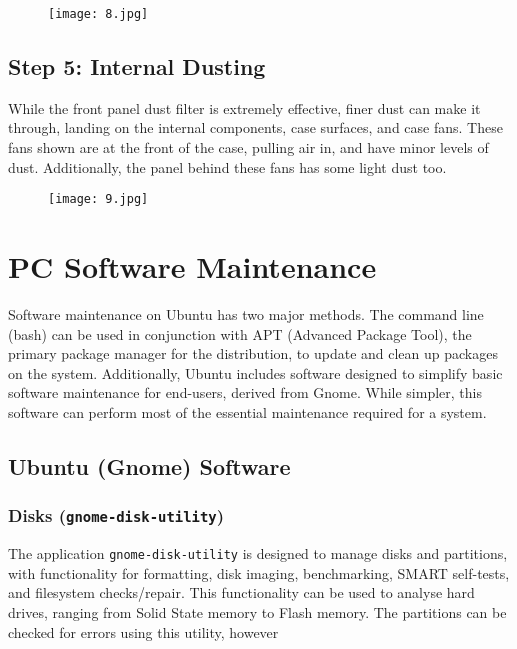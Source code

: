 \documentclass[11pt]{amsart}
\begin{document}
\begin{figure}[h]{}
\centering\texttt{[image: 8.jpg]}
\caption{}

\end{figure}

\hypertarget{x-step-5:-internal-dusting}{\subsection*{Step 5: Internal Dusting}}
While the front panel dust filter is extremely effective, finer dust can make it through, landing on the internal components, case surfaces, and case fans. These fans shown are at the front of the case, pulling air in, and have minor levels of dust. Additionally, the panel behind these fans has some light dust too.


\begin{figure}[h]{}
\centering\texttt{[image: 9.jpg]}
\caption{}

\end{figure}

\hypertarget{x-pc-software-maintenance}{\section*{PC Software Maintenance}}
Software maintenance on Ubuntu has two major methods. The command line (bash) can be used in conjunction with APT (Advanced Package Tool), the primary package manager for the distribution, to update and clean up packages on the system. Additionally, Ubuntu includes software designed to simplify basic software maintenance for end-users, derived from Gnome. While simpler, this software can perform most of the essential maintenance required for a system.


\hypertarget{x-ubuntu-(gnome)-software}{\subsection*{Ubuntu (Gnome) Software}}
\hypertarget{x-disks-(\texttt{gnome-disk-utility})}{\subsubsection*{Disks (\texttt{gnome-disk-utility})}}
The application \texttt{gnome-disk-utility} is designed to manage disks and partitions, with functionality for formatting, disk imaging, benchmarking, SMART self-tests, and filesystem checks/repair. This functionality can be used to analyse hard drives, ranging from Solid State memory to Flash memory. The partitions can be checked for errors using this utility, however
\end{document}
